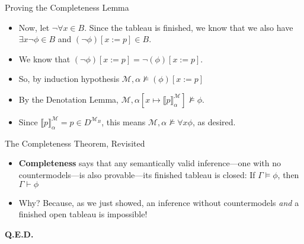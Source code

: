 \begin{frame}{Proving the Completeness Lemma}

  \begin{itemize}
	\itemsep=16pt

  \item Now, let $\neg\forall x\in B$. Since the tableau is finished, we know that we also have $\exists x\neg\phi\in B$ and $(\neg \phi)[x:=p]\in B$.

    \item We know that $(\neg \phi)[x:=p]=\neg (\phi)[x:=p]$.

      \item So, by induction hypothesis $\mathcal{M}, \alpha\nvDash
        (\phi)[x:=p]$

        \item By the Denotation Lemma,
          $\mathcal{M},\alpha[x\mapsto \llbracket
          p\rrbracket^\mathcal{M}_\alpha]\nvDash \phi$.

          \item Since $\llbracket
            p\rrbracket^\mathcal{M}_\alpha=p\in D^{\mathcal{M}_B}$,
            this means $\mathcal{M},\alpha\nvDash \forall  x\phi$, as desired.
    
  \end{itemize}
  
\end{frame}

\begin{frame}{The Completeness Theorem, Revisited}

	\begin{itemize}%
	\itemsep=16pt

        \item \textbf{Completeness} says that any semantically valid inference---one with no countermodels---is also provable---its finished tableau is closed: If $\Gamma\vDash\phi$, then $\Gamma\vdash\phi$
        
        \item Why? Because, as we just showed, an inference without countermodels \emph{and} a finished open tableau is impossible!
        
	\end{itemize}

\end{frame}

\begin{frame}

\vfill

\begin{center}
{\Large \textbf{Q.E.D.}}
\end{center}
  
\end{frame}
